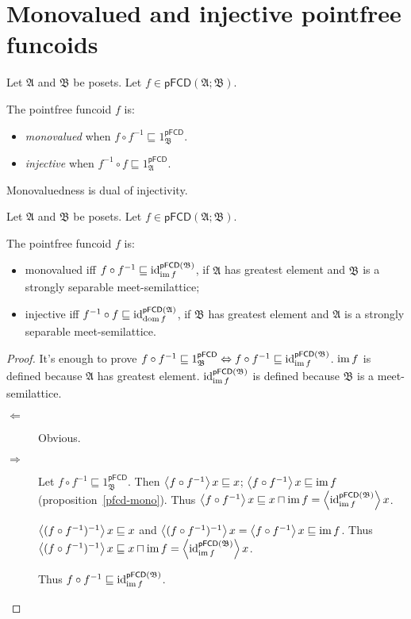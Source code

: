 \section{Monovalued and injective pointfree funcoids}
\begin{defn}
Let $\mathfrak{A}$ and $\mathfrak{B}$ be posets. Let $f\in\mathsf{pFCD}(\mathfrak{A};\mathfrak{B})$.

The pointfree funcoid $f$ is:
\begin{itemize}
\item {}\emph{monovalued} when $f\circ f^{-1}\sqsubseteq1_{\mathfrak{B}}^{\mathsf{pFCD}}$.
\item {}\emph{injective} when $f^{-1}\circ f\sqsubseteq1_{\mathfrak{A}}^{\mathsf{pFCD}}$.
\end{itemize}
\end{defn}
Monovaluedness is dual of injectivity.
\begin{prop}
Let $\mathfrak{A}$ and $\mathfrak{B}$ be posets. Let $f\in\mathsf{pFCD}(\mathfrak{A};\mathfrak{B})$.

The pointfree funcoid $f$ is:
\begin{itemize}
\item monovalued iff $f\circ f^{-1}\sqsubseteq\operatorname{id}_{\operatorname{im} f}^{\mathsf{pFCD}(\mathfrak{B})}$,
if $\mathfrak{A}$ has greatest element and $\mathfrak{B}$ is a strongly separable meet-semilattice;
\item injective iff $f^{-1}\circ f\sqsubseteq\operatorname{id}_{\operatorname{dom} f}^{\mathsf{pFCD}(\mathfrak{A})}$,
if $\mathfrak{B}$ has greatest element and $\mathfrak{A}$ is a strongly separable meet-semilattice. 
\end{itemize}
\end{prop}
\begin{proof}
It's enough to prove $f\circ f^{-1}\sqsubseteq1_{\mathfrak{B}}^{\mathsf{pFCD}}\Leftrightarrow f\circ f^{-1}\sqsubseteq\operatorname{id}_{\operatorname{im} f}^{\mathsf{pFCD}(\mathfrak{B})}$.
$\operatorname{im} f$ is defined because $\mathfrak{A}$ has greatest element. $\operatorname{id}_{\operatorname{im} f}^{\mathsf{pFCD}(\mathfrak{B})}$ is defined because $\mathfrak{B}$ is a meet-semilattice.
\begin{description}
\item [{$\Leftarrow$}] Obvious.
\item [{$\Rightarrow$}] Let $f\circ f^{-1}\sqsubseteq1_{\mathfrak{B}}^{\mathsf{pFCD}}$.
Then $\left\langle f\circ f^{-1}\right\rangle x\sqsubseteq x$; $\left\langle f\circ f^{-1}\right\rangle x\sqsubseteq\operatorname{im} f$ (proposition~\ref{pfcd-mono}).
Thus $\left\langle f\circ f^{-1}\right\rangle x\sqsubseteq x\sqcap\operatorname{im} f=\left\langle \operatorname{id}_{\operatorname{im} f}^{\mathsf{pFCD}(\mathfrak{B})}\right\rangle x$.


$\left\langle (f\circ f^{-1})^{-1}\right\rangle x\sqsubseteq x$ and $\left\langle (f\circ f^{-1})^{-1}\right\rangle x=\left\langle f\circ f^{-1}\right\rangle x\sqsubseteq\operatorname{im} f$.
Thus $\left\langle (f\circ f^{-1})^{-1}\right\rangle x\sqsubseteq x\sqcap\operatorname{im} f=\left\langle \operatorname{id}_{\operatorname{im} f}^{\mathsf{pFCD}(\mathfrak{B})}\right\rangle x$.


Thus $f\circ f^{-1}\sqsubseteq\operatorname{id}_{\operatorname{im} f}^{\mathsf{pFCD}(\mathfrak{B})}$.

\end{description}
\end{proof}
